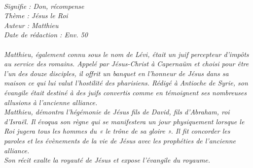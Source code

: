 \BFont
\noindent\hrulefill
{\footnotesize
\textit{
\bigskip
{\centering{}
\\Signifie : Don, récompense
\\Thème : Jésus le Roi
\\Auteur : Matthieu
\\Date de rédaction : Env. 50\\}
}
\textit{
\\Matthieu, également connu sous le nom de Lévi, était un juif percepteur d’impôts au service des romains. Appelé par Jésus-Christ à Capernaüm et choisi pour être l’un des douze disciples, il offrit un banquet en l’honneur de Jésus dans sa maison ce qui lui valut l’hostilité des pharisiens.  Rédigé à Antioche de Syrie, son évangile était destiné à des juifs convertis comme en témoignent ses nombreuses allusions à l’ancienne alliance.
\\Matthieu, démontra l’hégémonie de Jésus fils de David, fils d’Abraham, roi d’Israël. Il évoqua  son règne qui se manifestera un jour physiquement lorsque le Roi jugera tous les hommes du « le trône de sa gloire ». Il fit concorder  les paroles et les évènements de la vie de Jésus avec les prophéties de l’ancienne alliance.
\\Son récit exalte la royauté de Jésus et expose l’évangile du royaume.\bigskip
}
}
\par\nobreak\noindent\hrulefill
